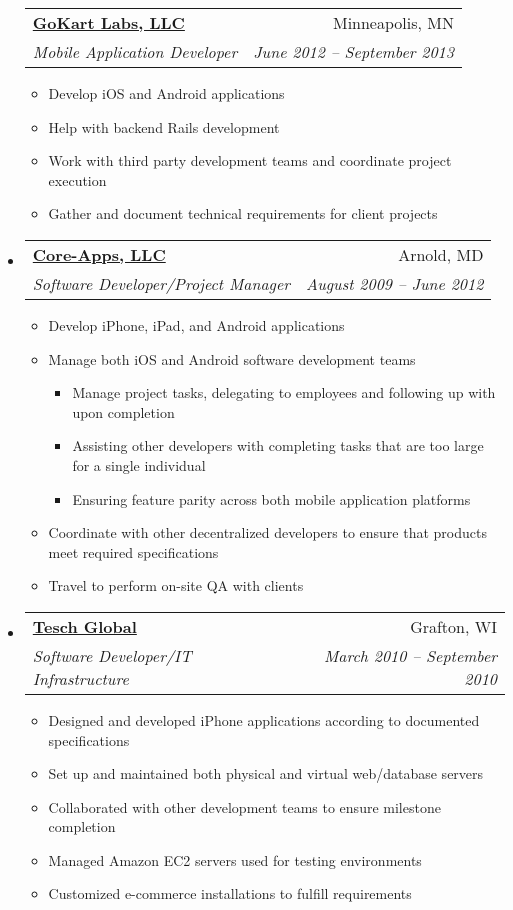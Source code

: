 \documentclass[letterpaper,12pt]{article}
\makeatletter
\newcommand{\resitem}[1]{\item #1 \vspace{-2pt}}
\newcommand{\ressubheading}[4]{
\begin{tabular*}{6.5in}{l@{\extracolsep{\fill}}r}
		\textbf{#1} & #2 \\
		\textit{#3} & \textit{#4} \\
\end{tabular*}\vspace{-6pt}}
\makeatother
\begin{document}
\begin{itemize}
			\ressubheading{\href{http://www.gokartlabs.com}{GoKart Labs, LLC}}{Minneapolis, MN}{Mobile Application Developer}{June 2012 -- September 2013}
				{ \footnotesize
				\begin{itemize}
					\resitem{Develop iOS and Android applications}
					\resitem{Help with backend Rails development}
					\resitem{Work with third party development teams and coordinate project execution}
					\resitem{Gather and document technical requirements for client projects}
				\end{itemize}
         }
     \item
			\ressubheading{\href{http://www.core-apps.com/Home.html}{Core-Apps, LLC}}{Arnold, MD}{Software Developer/Project Manager}{August 2009 -- June 2012}
				{ \footnotesize
				\begin{itemize}
					\resitem{Develop iPhone, iPad, and Android applications}
					\resitem{Manage both iOS and Android software development teams}
						\begin{itemize}
							\resitem{Manage project tasks, delegating to employees and following  up with upon completion}
							\resitem{Assisting other developers with completing tasks that are too large for a single individual}
							\resitem{Ensuring feature parity across both mobile application platforms}
						\end{itemize}
					\resitem{Coordinate with other decentralized developers to ensure that products meet required specifications}
					\resitem{Travel to perform on-site QA with clients}
				\end{itemize}
         }
     \item
			\ressubheading{\href{http://www.teschglobal.com/}{Tesch Global}}{Grafton, WI}{Software Developer/IT Infrastructure}{March 2010 -- September 2010}
				{ \footnotesize
				\begin{itemize}
					\resitem{Designed and developed iPhone applications according to documented specifications}
					\resitem{Set up and maintained both physical and virtual web/database servers}
					\resitem{Collaborated with other development teams to ensure milestone completion}
					\resitem{Managed Amazon EC2 servers used for testing environments}
					\resitem{Customized e-commerce installations to fulfill requirements}
				\end{itemize}
         }


\end{itemize}
\end{document}
